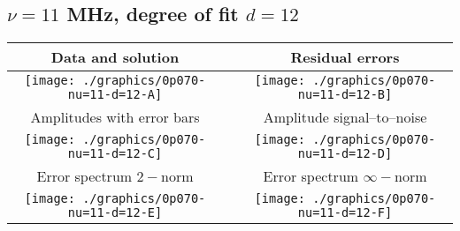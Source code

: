 

% 

\clearpage{}
\break{}

\subsection{$\nu = 11$ MHz, degree of fit $d = 12$}

\begin{table}[h]
    \begin{center}
        \begin{tabular}{ccc}
            Data and solution & \quad & Residual errors \\\hline
            \texttt{[image: ./graphics/0p070-nu=11-d=12-A]} &&
            \texttt{[image: ./graphics/0p070-nu=11-d=12-B]} \\[15pt]
            Amplitudes with error bars && Amplitude signal--to--noise \\\hline
            \texttt{[image: ./graphics/0p070-nu=11-d=12-C]} &&
            \texttt{[image: ./graphics/0p070-nu=11-d=12-D]} \\[15pt]
            Error spectrum $2-$norm && Error spectrum $\infty-$norm \\\hline
            \texttt{[image: ./graphics/0p070-nu=11-d=12-E]} &&
            \texttt{[image: ./graphics/0p070-nu=11-d=12-F]} \\[15pt]
        \end{tabular}
    \end{center}
\label{fig:elev=70, nu=11}
\end{table}



\endinput
